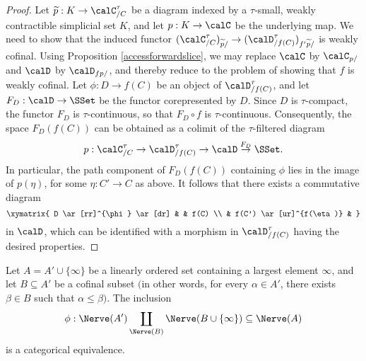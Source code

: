 \begin{proof}
Let $\widetilde{p}: K \rightarrow \calC^{\tau}_{/C}$ be a diagram indexed by a $\tau$-small, weakly contractible simplicial set $K$, and let $p: K \rightarrow \calC$ be the underlying map.
We need to show that
the induced functor $(\calC^{\tau}_{/C})_{\widetilde{p}/} \rightarrow (\calD^{\tau}_{/f(C)})_{f'  \widetilde{p}/}$ is weakly cofinal. Using Proposition \ref{accessforwardslice}, we may replace $\calC$ by $\calC_{p/}$ and
$\calD$ by $\calD_{f  p/}$, and thereby reduce to the problem of showing that $f$ is weakly cofinal.
Let $\phi: D \rightarrow f(C)$ be an object of $\calD^{\tau}_{/f(C)}$, and let
$F_{D}: \calD \rightarrow \SSet$ be the functor corepresented by $D$. Since $D$ is
$\tau$-compact, the functor $F_{D}$ is $\tau$-continuous, so that $F_{D} \circ f$
is $\tau$-continuous. Consequently, the space $F_{D}(f(C))$ can be obtained as a colimit
of the $\tau$-filtered diagram
$$p: \calC^{\tau}_{/C} \rightarrow \calD^{\tau}_{/f(C)} \rightarrow \calD \stackrel{F_{D}}{\rightarrow} \SSet.$$
In particular, the path component of $F_{D}(f(C))$ containing $\phi$ lies in the image
of $p(\eta)$, for some $\eta: C' \rightarrow C$ as above. It follows that there exists a commutative diagram
$$ \xymatrix{ D \ar[rr]^{\phi} \ar[dr] & & f(C) \\
& f(C') \ar[ur]^{f(\eta)} & }$$
in $\calD$, which can be identified with a morphism in $\calD^{\tau}_{/f(C)}$ having the desired properties.
\end{proof}

\begin{lemma}\label{pup1}
Let $A = A' \cup \{ \infty\}$ be a linearly ordered set containing a largest element $\infty$, and let
$B \subseteq A'$ be a cofinal subset $($in other words, for every $\alpha \in A'$, there
exists $\beta \in B$ such that $\alpha \leq \beta${}$)$. The inclusion
$$\phi: \Nerve(A') \coprod_{ \Nerve(B) } \Nerve ( B \cup \{ \infty\} ) \subseteq \Nerve(A)$$
is a categorical equivalence.
\end{lemma}

